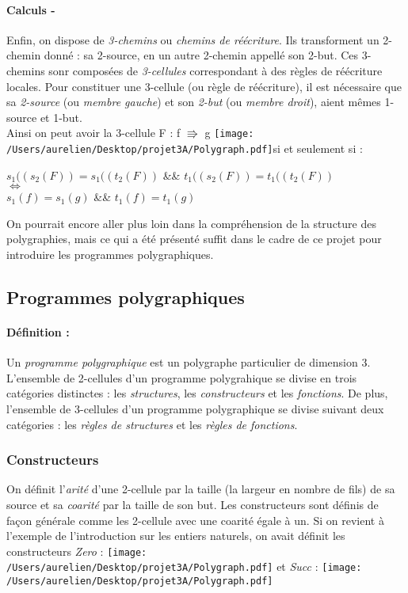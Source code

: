 \documentclass[a4paper,11pt,titlepage]{article}
\newcommand\insPolygraphPDF[1]{\texttt{[image: /Users/aurelien/Desktop/projet3A/Polygraph.pdf]}}
\begin{document}
\paragraph{Calculs -}
Enfin, on dispose de \textit{3-chemins} ou \textit{chemins de r\'{e}\'{e}criture}. Ils transforment un 2-chemin donn\'{e} : sa 2-source, en un autre 2-chemin appell\'{e} son 2-but. Ces 3-chemins sonr compos\'{e}es de \textit{3-cellules} correspondant \`{a} des r\`{e}gles de r\'{e}\'{e}criture locales. Pour constituer une 3-cellule (ou r\`{e}gle de r\'{e}\'{e}criture), il est n\'{e}cessaire que sa \textit{2-source} (ou \textit{membre gauche}) et son \textit{2-but} (ou \textit{membre droit}), aient m\^{e}mes 1-source et 1-but.\\Ainsi on peut avoir la 3-cellule F : f $\Rrightarrow$ g \insPolygraphPDF{5}si et seulement si : 
\begin{center}$s_{1}((s_{2}(F))= s_{1}((t_{2}(F))$ \&\&  $t_{1}((s_{2}(F))= t_{1}((t_{2}(F))$ \\$\iff$\\$s_{1}(f)= s_{1}(g)$ \&\&  $t_{1}(f)= t_{1}(g)$\end{center}
On pourrait encore aller plus loin dans la compr\'{e}hension de la structure des polygraphies, mais ce qui a \'{e}t\'{e} pr\'{e}sent\'{e} suffit dans le cadre de ce projet pour introduire les programmes polygraphiques.
\subsection{Programmes polygraphiques}
\paragraph{D\'{e}finition :} Un \textit{programme polygraphique} est un polygraphe particulier de dimension 3. L'ensemble de 2-cellules d'un programme polygrahique se divise en trois cat\'{e}gories distinctes : les \textit{structures}, les \textit{constructeurs} et les \textit{fonctions}. De plus, l'ensemble de 3-cellules d'un programme polygraphique se divise suivant deux cat\'{e}gories : les \textit{r\`{e}gles de structures} et les \textit{r\`{e}gles de fonctions}.
\subsubsection{Constructeurs}On d\'{e}finit l'\textit{arit\'{e}} d'une 2-cellule par la taille (la largeur en nombre de fils) de sa source et sa \textit{coarit\'{e}} par la taille de son but. Les constructeurs sont d\'{e}finis de fa\c{c}on g\'{e}n\'{e}rale comme les 2-cellule avec une coarit\'{e} \'{e}gale \`{a} un. Si on revient \`{a} l'exemple de l'introduction sur les entiers naturels, on avait d\'{e}finit les constructeurs \textit{Zero} : \insPolygraphPDF{9} et \textit{Succ} :  \insPolygraphPDF{10}
\end{document}
